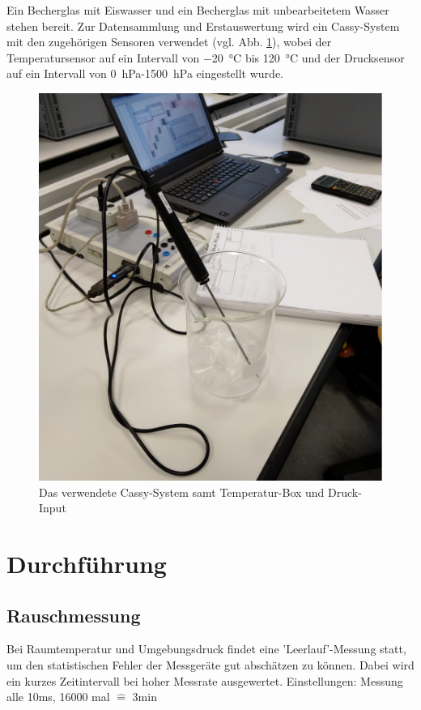 \documentclass[]{article}
\begin{document}
	Ein Becherglas mit Eiswasser und ein Becherglas mit unbearbeitetem Wasser stehen bereit. Zur Datensammlung und Erstauswertung wird ein Cassy-System mit den zugehörigen Sensoren verwendet (vgl. Abb. \ref{Cassy}), wobei der Temperatursensor auf ein Intervall von \SI{-20}{\celsius} bis \SI{120}{\celsius} und der Drucksensor auf ein Intervall von \SI{0}{\hecto\pascal}-\SI{1500}{\hecto\pascal} eingestellt wurde.
	\begin{figure}
		\begin{center}
			\includegraphics[scale=0.33]{Images/Cassy.jpg}
			\caption{Das verwendete Cassy-System samt Temperatur-Box und Druck-Input}
			\label{Cassy}
		\end{center}
	\end{figure}
	
	
	\section{Durchführung}
	\subsection{Rauschmessung}
	Bei Raumtemperatur und Umgebungsdruck findet eine 'Leerlauf'-Messung statt, um den statistischen Fehler der Messgeräte gut abschätzen zu können. Dabei wird ein kurzes Zeitintervall bei hoher Messrate ausgewertet. 
	Einstellungen: Messung alle 10ms, 16000 mal $\widehat{=}$ 3min
	
\end{document}
